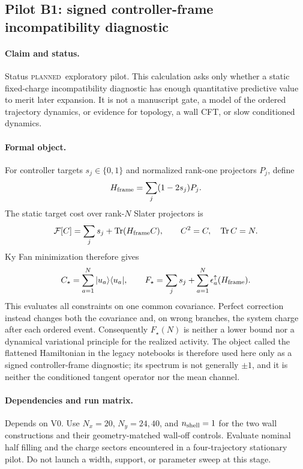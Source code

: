 \documentclass[aps,prx,onecolumn,nofootinbib,superscriptaddress,longbibliography]{revtex4-2}
\newcommand{\qTr}{\operatorname{Tr}}
\newcommand{\planned}{\textsc{planned}}
\begin{document}
\subsection{Pilot B1: signed controller-frame incompatibility diagnostic}
\paragraph{Claim and status.}
Status \planned\ exploratory pilot.  This calculation asks only whether a static
fixed-charge incompatibility diagnostic has enough quantitative predictive value to merit
later expansion.  It is not a manuscript gate, a model of the ordered trajectory
dynamics, or evidence for topology, a wall CFT, or slow conditioned dynamics.

\paragraph{Formal object.}
For controller targets $s_j\in\{0,1\}$ and normalized rank-one projectors $P_j$, define
\begin{equation}
 H_{\rm frame}=\sum_j(1-2s_j)P_j .
 \label{eq:controller-frame-operator}
\end{equation}
The static target cost over rank-$N$ Slater projectors is
\begin{equation}
 \mathcal F[C]
 =\sum_js_j+\qTr(H_{\rm frame}C),\qquad C^2=C,\quad\qTr C=N.
 \label{eq:static-target-cost}
\end{equation}
Ky Fan minimization therefore gives
\begin{equation}
 C_\star=\sum_{a=1}^{N}|u_a\rangle\langle u_a|,\qquad
 F_\star=\sum_js_j+\sum_{a=1}^{N}\epsilon_a^\uparrow(H_{\rm frame}).
 \label{eq:static-frame-minimum}
\end{equation}
This evaluates all constraints on one common covariance.  Perfect correction instead
changes both the covariance and, on wrong branches, the system charge after each ordered
event.  Consequently $F_\star(N)$ is neither a lower bound nor a dynamical variational
principle for the realized activity.  The object called the flattened Hamiltonian in the
legacy notebooks is therefore used here only as a signed controller-frame diagnostic; its
spectrum is not generally $\pm1$, and it is neither the conditioned tangent operator nor
the mean channel.

\paragraph{Dependencies and run matrix.}
Depends on V0.  Use $N_x=20$, $N_y=24,40$, and $n_{\rm shell}=1$ for the two wall
constructions and their geometry-matched wall-off controls.  Evaluate nominal half filling
and the charge sectors encountered in a four-trajectory stationary pilot.  Do not launch a
width, support, or parameter sweep at this stage.
\end{document}
